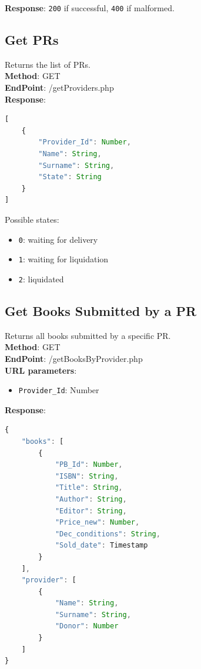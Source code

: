 \textbf{Response}: \texttt{200} if successful, \texttt{400} if malformed.

\subsection{Get PRs}
Returns the list of PRs.\\

\textbf{Method}: GET \\
\textbf{EndPoint}: /getProviders.php \\

\textbf{Response}:
\begin{lstlisting}[language=JavaScript, basicstyle=\ttfamily]
[
    {
        "Provider_Id": Number,
        "Name": String,
        "Surname": String,
        "State": String
    }
]
\end{lstlisting}

Possible states:
\begin{itemize}
    \item \texttt{0}: waiting for delivery
    \item \texttt{1}: waiting for liquidation
    \item \texttt{2}: liquidated
\end{itemize}

\subsection{Get Books Submitted by a PR}
Returns all books submitted by a specific PR.\\

\textbf{Method}: GET \\
\textbf{EndPoint}: /getBooksByProvider.php \\

\textbf{URL parameters}:
\begin{itemize}
    \item \texttt{Provider\_Id}: Number
\end{itemize}

\textbf{Response}:
\begin{lstlisting}[language=JavaScript, basicstyle=\ttfamily]
{
    "books": [
        {
            "PB_Id": Number,
            "ISBN": String,
            "Title": String,
            "Author": String,
            "Editor": String,
            "Price_new": Number,
            "Dec_conditions": String,
            "Sold_date": Timestamp
        }
    ],
    "provider": [
        {
            "Name": String,
            "Surname": String,
            "Donor": Number
        }
    ]
}
\end{lstlisting}

